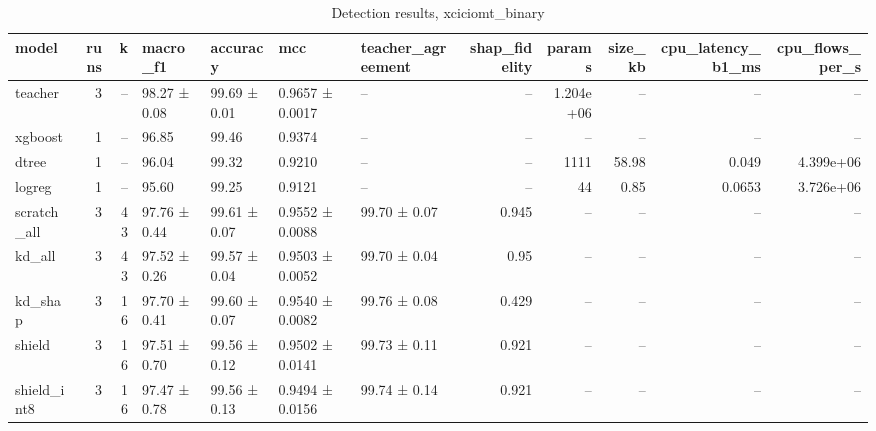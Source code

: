 \begin{table}
\caption{Detection results, xciciomt_binary}
\begin{tabular}{lrrllllrrrrr}
\toprule
model & runs & k & macro_f1 & accuracy & mcc & teacher_agreement & shap_fidelity & params & size_kb & cpu_latency_b1_ms & cpu_flows_per_s \\
\midrule
teacher & 3 & -- & 98.27 ± 0.08 & 99.69 ± 0.01 & 0.9657 ± 0.0017 & -- & -- & 1.204e+06 & -- & -- & -- \\
xgboost & 1 & -- & 96.85 & 99.46 & 0.9374 & -- & -- & -- & -- & -- & -- \\
dtree & 1 & -- & 96.04 & 99.32 & 0.9210 & -- & -- & 1111 & 58.98 & 0.049 & 4.399e+06 \\
logreg & 1 & -- & 95.60 & 99.25 & 0.9121 & -- & -- & 44 & 0.85 & 0.0653 & 3.726e+06 \\
scratch_all & 3 & 43 & 97.76 ± 0.44 & 99.61 ± 0.07 & 0.9552 ± 0.0088 & 99.70 ± 0.07 & 0.945 & -- & -- & -- & -- \\
kd_all & 3 & 43 & 97.52 ± 0.26 & 99.57 ± 0.04 & 0.9503 ± 0.0052 & 99.70 ± 0.04 & 0.95 & -- & -- & -- & -- \\
kd_shap & 3 & 16 & 97.70 ± 0.41 & 99.60 ± 0.07 & 0.9540 ± 0.0082 & 99.76 ± 0.08 & 0.429 & -- & -- & -- & -- \\
shield & 3 & 16 & 97.51 ± 0.70 & 99.56 ± 0.12 & 0.9502 ± 0.0141 & 99.73 ± 0.11 & 0.921 & -- & -- & -- & -- \\
shield_int8 & 3 & 16 & 97.47 ± 0.78 & 99.56 ± 0.13 & 0.9494 ± 0.0156 & 99.74 ± 0.14 & 0.921 & -- & -- & -- & -- \\
\bottomrule
\end{tabular}
\end{table}
